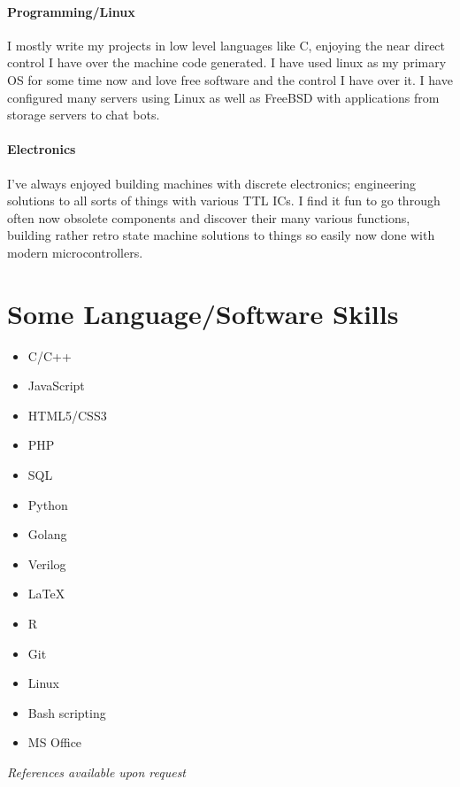 \documentclass[9pt,a4paper]{article}
\begin{document}
\begin{multicols*}{2}
\paragraph{Programming/Linux} 
I mostly write my projects in low level languages like C, enjoying the near direct control I have over the machine code generated.
I have used linux as my primary OS for some time now and love free software and the control I have over it.
I have configured many servers using Linux as well as FreeBSD with applications from storage servers to chat bots.
\vspace*{-0.1cm}
\paragraph{Electronics} I've always enjoyed building machines with discrete electronics;
engineering solutions to all sorts of things with various TTL ICs.
I find it fun to go through often now obsolete components and discover their many various functions, building rather retro state machine solutions to things so easily now done with modern microcontrollers.

\section*{Some Language/Software Skills}
\begin{multicols*}{2}
\begin{itemize}
\item C/C++
\item JavaScript
\item HTML5/CSS3
\item PHP
\item SQL
\item Python
\item Golang
\item Verilog
\item \LaTeX 
\item R
\item Git
\item Linux
\item Bash scripting
\item MS Office
\end{itemize}
\end{multicols*}
\vfill
\textit{References available upon request}
\end{multicols*}
\end{document}
